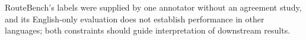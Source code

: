 RouteBench's labels were supplied by one annotator without an agreement study, and its English-only evaluation does not establish performance in other languages; both constraints should guide interpretation of downstream results.
